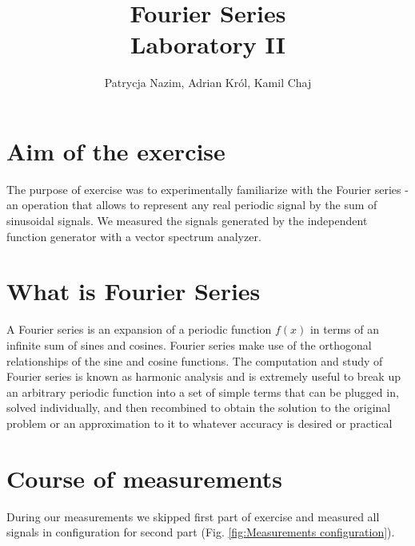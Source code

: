 \documentclass[notitlepage, a4paper, 11pt]{article}
\title{Fourier Series\\
	\large Laboratory II}
\author{Patrycja Nazim, Adrian Król, Kamil Chaj}
\date{}
\begin{document}
	\maketitle
	\section{Aim of the exercise}
	The purpose of exercise was to experimentally familiarize with the Fourier series - an operation
	that allows to represent any real periodic signal by the sum of sinusoidal signals. We measured the signals generated by the independent function generator with a vector spectrum analyzer.
	
	\section{What is Fourier Series}
	A Fourier series is an expansion of a periodic function $f(x)$ in terms of an infinite sum of sines and cosines. Fourier series make use of the orthogonal relationships of the sine and cosine functions. The computation and study of Fourier series is known as harmonic analysis and is extremely useful to break up an arbitrary periodic function into a set of simple terms that can be plugged in, solved individually, and then recombined to obtain the solution to the original problem or an approximation to it to whatever accuracy is desired or practical
	
	\section{Course of measurements}
	During our measurements we skipped first part of exercise and measured all signals in configuration for second part (Fig. \ref{fig:Measurements configuration}).
	
\end{document}
